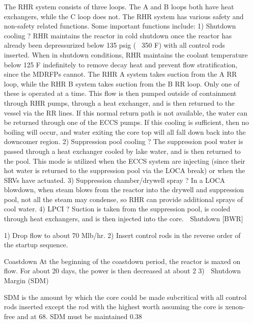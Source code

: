 \documentclass[10pt]{article}
\begin{document}
The RHR system consists of three loops. The A and B loops both have heat exchangers, while the C loop does not. The RHR system has various safety and non-safety related functions. Some important functions include:
1)	Shutdown cooling ? RHR maintains the reactor in cold shutdown once the reactor has already been depressurized below 135 psig (~ 350 F) with all control rods inserted. When in shutdown conditions, RHR maintains the coolant temperature below 125 F indefinitely to remove decay heat and prevent flow stratification, since the MDRFPs cannot. The RHR A system takes suction from the A RR loop, while the RHR B system takes suction from the B RR loop. Only one of these is operated at a time. This flow is then pumped outside of containment through RHR pumps, through a heat exchanger, and is then returned to the vessel via the RR lines. If this normal return path is not available, the water can be returned through one of the ECCS pumps. If this cooling is sufficient, then no boiling will occur, and water exiting the core top will all fall down back into the downcomer region. 
2)	Suppression pool cooling ? The suppression pool water is passed through a heat exchanger cooled by lake water, and is then returned to the pool. This mode is utilized when the ECCS system are injecting (since their hot water is returned to the suppression pool via the LOCA break) or when the SRVs have actuated. 
3)	Suppression chamber/drywell spray ? In a LOCA blowdown, when steam blows from the reactor into the drywell and suppression pool, not all the steam may condense, so RHR can provide additional sprays of cool water. 
4)	LPCI ? Suction is taken from the suppression pool, is cooled through heat exchangers, and is then injected into the core. 

Shutdown [BWR]

1)	Drop flow to about 70 Mlb/hr.
2)	Insert control rods in the reverse order of the startup sequence. 

Coastdown
At the beginning of the coastdown period, the reactor is maxed on flow. For about 20 days, the power is then decreased at about 2%
3)	
Shutdown Margin (SDM)

SDM is the amount by which the core could be made subcritical with all control rods inserted except the rod with the highest worth assuming the core is xenon-free and at 68. SDM must be maintained  0.38%
\end{document}
